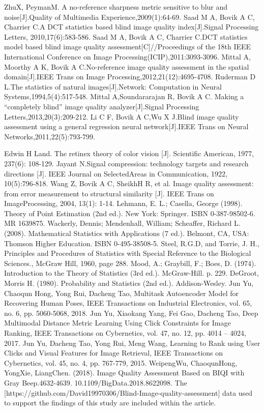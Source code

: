 \begin{thebibliography}{99}
 ZhuX, PeymanM. A no-reference sharpness metric sensitive to blur and noise[J].Quality of Multimedia Experience,2009(1):64-69.
 Saad M A, Bovik A C, Charrier C.A DCT statistics based blind image quality index[J].Signal Processing Letters, 2010,17(6):583-586.
 Saad M A, Bovik A C, Charrier C.DCT statistics model based blind image quality assessment[C]//Proceedings of the 18th IEEE International Conference on Image Processing(ICIP),2011:3093-3096.
Mittal A, Moorthy A K, Bovik A C.No-reference image quality assessment in the spatial domain[J].IEEE Trans on Image Processing,2012,21(12):4695-4708.
 Ruderman D L.The statistics of natural images[J].Network: Computation in Neural Systems,1994,5(4):517-548.
 Mittal A,Soundararajan R, Bovik A C. Making a “completely blind” image quality analyzer[J].Signal Processing Letters,2013,20(3):209-212.
 Li C F, Bovik A C,Wu X J.Blind image quality assessment using a general regression neural network[J].IEEE Trans on Neural Networks,2011,22(5):793-799.

 Edwin H Land. The retinex theory of color vision [J]. Scientific American, 1977, 237(6): 108-129.
 Jayant N.Signal compression: technology targets and research directions [J]. IEEE Journal on SelectedAreas in Communication, 1922, 10(5):796-818.
 Wang Z, Bovik A C, SheikhH R, et al. Image quality assessment: from error measurement to structural similarity [J]. IEEE Trans on ImageProcessing, 2004, 13(1): 1-14.
Lehmann, E. L.; Casella, George (1998). Theory of Point Estimation (2nd ed.). New York: Springer. ISBN 0-387-98502-6. MR 1639875.
Wackerly, Dennis; Mendenhall, William; Scheaffer, Richard L. (2008). Mathematical Statistics with Applications (7 ed.). Belmont, CA, USA: Thomson Higher Education. ISBN 0-495-38508-5.
Steel, R.G.D, and Torrie, J. H., Principles and Procedures of Statistics with Special Reference to the Biological Sciences., McGraw Hill, 1960, page 288.
Mood, A.; Graybill, F.; Boes, D. (1974). Introduction to the Theory of Statistics (3rd ed.). McGraw-Hill. p. 229.
DeGroot, Morris H. (1980). Probability and Statistics (2nd ed.). Addison-Wesley.
Jun Yu, Chaoqun Hong, Yong Rui, Dacheng Tao, Multitask Autoencoder Model for Recovering Human Poses, IEEE Transactions on Industrial Electronics, vol. 65, no. 6, pp. 5060-5068, 2018.
Jun Yu, Xiaokang Yang, Fei Gao, Dacheng Tao, Deep Multimodal Distance Metric Learning Using Click Constraints for Image Ranking, IEEE Transactions on Cybernetics, vol. 47, no. 12, pp. 4014 – 4024, 2017.
Jun Yu, Dacheng Tao, Yong Rui, Meng Wang, Learning to Rank using User Clicks and Visual Features for Image Retrieval, IEEE Transactions on Cybernetics, vol. 45, no. 4, pp. 767-779, 2015.
WeipengWu, ChaoqunHong, YongXie, LiangChen. (2018). Image Quality Assessment Based on BIQI with Gray Beep.4632-4639. 10.1109/BigData.2018.8622098. 
The [https://github.com/David19970306/Blind-Image-quality-assessment] data used to support the findings of this study are included within the article.




\end{thebibliography}
